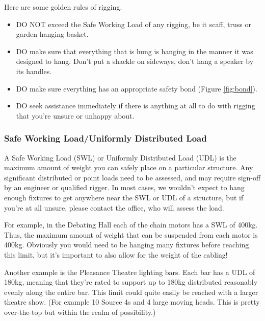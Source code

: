 \documentclass[14pt]{article} %
\let\Oldsubsubsection\subsubsection
\renewcommand{\subsubsection}{\FloatBarrier\Oldsubsubsection}
\begin{document}
Here are some golden rules of rigging.
\begin{itemize}
\item DO NOT exceed the Safe Working Load of any rigging, be it scaff, truss or garden hanging basket.
\item	DO make sure that everything that is hung is hanging in the manner it was designed to hang. Don’t put a shackle on sideways, don’t hang a speaker by its handles.
\item	DO make sure everything has an appropriate safety bond (Figure \ref{fig:bond}). 
\item	DO seek assistance immediately if there is anything at all to do with rigging that you’re unsure or unhappy about.

\end{itemize}

\subsubsection{Safe Working Load/Uniformly Distributed Load}
A Safe Working Load (SWL) or Uniformly Distributed Load (UDL) is the maximum amount of weight you can safely place on a particular structure. Any significant distributed or point loads need to be assessed, and may require sign-off by an engineer or qualified rigger. In most cases, we wouldn’t expect to hang enough fixtures to get anywhere near the SWL or UDL of a structure, but if you’re at all unsure, please contact the office, who will assess the load.

For example, in the Debating Hall each of the chain motors has a SWL of 400kg. Thus, the maximum amount of weight that can be suspended from each motor is 400kg. Obviously you would need to be hanging many fixtures before reaching this limit, but it’s important to also allow for the weight of the cabling!

Another example is the Pleasance Theatre lighting bars. Each bar has a UDL of 180kg, meaning that they’re rated to support up to 180kg distributed reasonably evenly along the entire bar. This limit could quite easily be reached with a larger theatre show. (For example 10 Source 4s and 4 large moving heads. This is pretty over-the-top but within the realm of possibility.)
\end{document}
